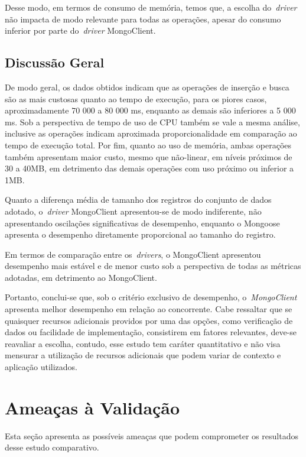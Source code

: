 \documentclass[12pt]{article}
\begin{document}
Desse modo, em termos de consumo de memória, temos que, a escolha do~\emph{driver} não impacta de modo relevante para todas as operações, apesar do consumo inferior por parte do~\emph{driver} MongoClient.

\subsection{Discussão Geral}
\label{qgeral}

De modo geral, os dados obtidos indicam que as operações de inserção e busca são as mais custosas quanto ao tempo de execução, para os piores casos, aproximadamente 70 000 a 80 000 ms, enquanto as demais são inferiores a 5 000 ms.
Sob a perspectiva de tempo de uso de CPU também se vale a mesma análise, inclusive as operações indicam aproximada proporcionalidade em comparação ao tempo de execução total.
Por fim, quanto ao uso de memória, ambas operações também apresentam maior custo, mesmo que não-linear, em níveis próximos de 30 a 40MB, em detrimento das demais operações com uso próximo ou inferior a 1MB.

Quanto a diferença média de tamanho dos registros do conjunto de dados adotado, o~\emph{driver} MongoClient apresentou-se de modo indiferente, não apresentando oscilações significativas de desempenho, enquanto o Mongoose apresenta o desempenho diretamente proporcional ao tamanho do registro.

Em termos de comparação entre os~\emph{drivers}, o MongoClient apresentou desempenho mais estável e de menor custo sob a perspectiva de todas as métricas adotadas, em detrimento ao MongoClient.

Portanto, conclui-se que, sob o critério exclusivo de desempenho, o~\emph{MongoClient} apresenta melhor desempenho em relação ao concorrente.
Cabe ressaltar que se quaisquer recursos adicionais providos por uma das opções, como verificação de dados ou facilidade de implementação, consistirem em fatores relevantes, deve-se reavaliar a escolha, contudo, esse estudo tem caráter quantitativo e não visa mensurar a utilização de recursos adicionais que podem variar de contexto e aplicação utilizados.

\section{Ameaças à Validação}
\label{section:limitacoes}

Esta seção apresenta as possíveis ameaças que podem comprometer os resultados desse estudo comparativo.
\end{document}
